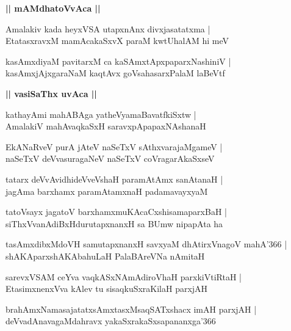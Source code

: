 \documentclass[twoside,12pt,openright]{book}
\newcounter{shloka}[chapter]
\def\uvaca#1{\centerline{{\large\textbf{#1}}}}
\begin{document}
\uvaca{|| mAMdhatoVvAca ||}

\begin{shloka}%
Amalakiv kada heyxVSA utapxnAnx divxjasatatxma |\\
EtatasxravxM mamAcakaSxvX paraM kwtUhalAM hi meV 
\end{shloka}

\begin{shloka}%
kasAmxdiyaM pavitarxM ca kaSAmxtApxpaparxNashiniV |\\
kasAmxjAjxgaraNaM kaqtAvx goVsahasarxPalaM laBeVtf
\end{shloka}

\uvaca{|| vasiSaThx uvAca ||}

\begin{shloka}%
kathayAmi mahABAga yatheVyamaBavatfkiSxtw |\\
AmalakiV mahAvaqkaSxH saravxpApapaxNAshanaH 
\end{shloka}

\begin{shloka}%
EkANaRveV purA jAteV naSeTxV sAthxvarajaMgameV |\\
naSeTxV deVvasuragaNeV naSeTxV coVragarAkaSxseV 
\end{shloka}

\begin{shloka}%
tatarx deVvAvidhideVveVshaH paramAtAmx sanAtanaH |\\
jagAma barxhamx paramAtamxnaH padamavayxyaM 
\end{shloka}

\begin{shloka}%
tatoVsayx jagatoV barxhamxmuKAcaCxshisamaparxBaH |\\
siThxVvanAdiBxHdurutapxnanxH sa BUmw nipapAta ha 
\end{shloka}

\begin{shloka}%
tasAmxdibxMdoVH samutapxnanxH savxyaM dhAtirxVnagoV mahA\char'366 |\\
shAKAparxshAKAbahuLaH PalaBAreVNa nAmitaH 
\end{shloka}

\begin{shloka}%
sarevxVSAM ceYva vaqkASxNAmAdiroVhaH parxkiVtiRtaH |\\
EtasimxnenxVva kAlev tu sisaqkuSxraKilaH parxjAH
\end{shloka}

\begin{shloka}%
brahAmxNamasajatatxsAmxtasxMsaqSATxshacx imAH parxjAH |\\
deVvadAnavagaMdahravx yakaSxrakaSxsapananxga\char'366
\end{shloka}
\end{document}
